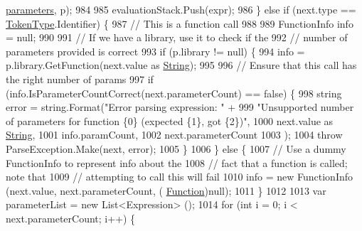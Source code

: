 \begin{DoxyCode}
      \hyperlink{a00094_a7b21380bead8ae08b2cfc6594edab32c}{parameters}, p);
984 
985                         evaluationStack.Push(expr);
986                     \} \textcolor{keywordflow}{else} \textcolor{keywordflow}{if} (next.type == \hyperlink{a00041_a301aa7c866593a5b625a8fc158bbeace}{TokenType}.Identifier) \{
987                         \textcolor{comment}{// This is a function call}
988 
989                         FunctionInfo info = null;
990 
991                         \textcolor{comment}{// If we have a library, use it to check if the}
992                         \textcolor{comment}{// number of parameters provided is correct}
993                         \textcolor{keywordflow}{if} (p.library != null) \{
994                             info = p.library.GetFunction(next.value as \hyperlink{a00041_a301aa7c866593a5b625a8fc158bbeacea27118326006d3829667a400ad23d5d98}{String});
995 
996                             \textcolor{comment}{// Ensure that this call has the right number of params}
997                             \textcolor{keywordflow}{if} (info.IsParameterCountCorrect(next.parameterCount) == \textcolor{keyword}{false}) \{
998                                 \textcolor{keywordtype}{string} error = string.Format(\textcolor{stringliteral}{"Error parsing expression: "} +
999                                     \textcolor{stringliteral}{"Unsupported number of parameters for function \{0\} (expected \{1\}, got
       \{2\})"},
1000                                     next.value as \hyperlink{a00041_a301aa7c866593a5b625a8fc158bbeacea27118326006d3829667a400ad23d5d98}{String},
1001                                     info.paramCount,
1002                                     next.parameterCount
1003                                 );
1004                                 \textcolor{keywordflow}{throw} ParseException.Make(next, error);
1005                             \}
1006                         \} \textcolor{keywordflow}{else} \{
1007                             \textcolor{comment}{// Use a dummy FunctionInfo to represent info about the}
1008                             \textcolor{comment}{// fact that a function is called; note that}
1009                             \textcolor{comment}{// attempting to call this will fail}
1010                             info = \textcolor{keyword}{new} FunctionInfo (next.value, next.parameterCount, (
      \hyperlink{a00041_ae0be2e5cf13d5779816102439e61ff1a}{Function})null);
1011                         \}
1012 
1013                         var parameterList = \textcolor{keyword}{new} List<Expression> ();
1014                         \textcolor{keywordflow}{for} (\textcolor{keywordtype}{int} i = 0; i < next.parameterCount; i++) \{

\end{DoxyCode}
